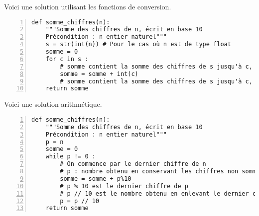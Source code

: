 Voici une solution utilisant les fonctions de conversion.
\begin{Verbatim}[gobble=0,numbers=left]
def somme_chiffres(n):
    """Somme des chiffres de n, écrit en base 10
    Précondition : n entier naturel"""
    s = str(int(n)) # Pour le cas où n est de type float
    somme = 0
    for c in s :
        # somme contient la somme des chiffres de s jusqu'à c, exclu
        somme = somme + int(c)
        # somme contient la somme des chiffres de s jusqu'à c, inclu
    return somme
\end{Verbatim}
Voici une solution arithmétique.
\begin{Verbatim}[gobble=0,numbers=left]
def somme_chiffres(n):
    """Somme des chiffres de n, écrit en base 10
    Précondition : n entier naturel"""
    p = n
    somme = 0 
    while p != 0 : 
        # On commence par le dernier chiffre de n
        # p : nombre obtenu en conservant les chiffres non sommés
        somme = somme + p%10
        # p % 10 est le dernier chiffre de p
        # p // 10 est le nombre obtenu en enlevant le dernier chiffre de p
        p = p // 10
    return somme
\end{Verbatim}